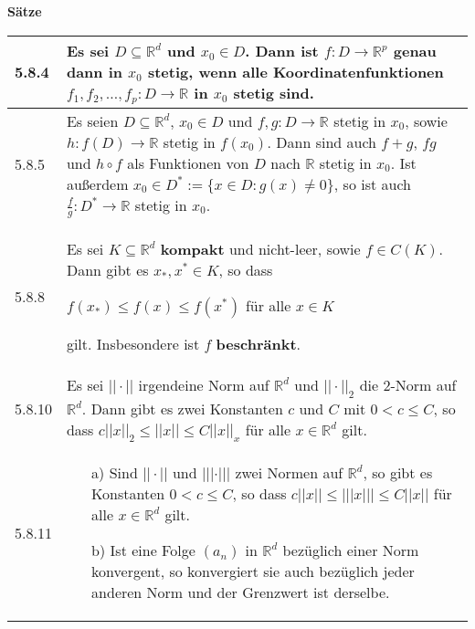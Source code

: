     \noindent 
    \textbf{Sätze}
    \begin{table}[H]
    \begin{tabularx}{\textwidth}{X m{16cm}}
        \toprule

        5.8.4 & Es sei $D \subseteq \mathbb{R}^d$ und $x_0 \in D$. Dann ist $f: D \rightarrow \mathbb{R}^p$ genau dann in $x_0$
                \textbf{stetig}, wenn alle Koordinatenfunktionen $f_1, f_2, \dots, f_p : D \rightarrow \mathbb{R}$ in $x_0$ stetig sind. \\
        \midrule
        5.8.5 &  Es seien $D \subseteq \mathbb{R}^d$, $x_0 \in D$ und $f,g : D \rightarrow \mathbb{R}$ stetig in $x_0$, sowie
                $h : f(D) \rightarrow \mathbb{R}$ stetig in $f(x_0)$. Dann sind auch $f+g$, $fg$ und $h \circ f$ als Funktionen
                von $D$ nach $\mathbb{R}$ stetig in $x_0$. \hfill \break
                Ist au\ss erdem $x_0 \in D^* := \{x \in D: g(x) \neq 0\}$, so ist auch $\frac{f}{g}:D^* \rightarrow \mathbb{R}$ stetig in $x_0$. \\
        \midrule
        5.8.8 & Es sei $K \subseteq \mathbb{R}^d$ \textbf{kompakt} und nicht-leer, sowie $f \in C(K)$. Dann gibt es $x_*, x^* \in K$, so dass \hfill \break
                \centerline{$f(x_*) \leq f(x) \leq f(x^*)$ für alle $x \in K$}
                gilt. Insbesondere ist $f$ \textbf{beschränkt}. \\
        \midrule
        5.8.10& Es sei $||\cdot||$ irgendeine Norm auf $\mathbb{R}^d$ und $||\cdot||_2$ die 2-Norm auf $\mathbb{R}^d$. Dann gibt es zwei Konstanten
                $c$ und $C$ mit $0 < c \leq C$, so dass $c||x||_2  \leq ||x|| \leq C ||x||_x$ für alle $x \in \mathbb{R}^d$ gilt. \\
        \midrule
        5.8.11& \begin{itemize}[topsep=-0.5cm]
                    \item[a)] Sind $||\cdot||$ und $|||\cdot|||$ zwei Normen auf $\mathbb{R}^d$, so gibt es Konstanten $0 < c \leq C$, so dass
                                $c||x|| \leq |||x||| \leq C||x||$ für alle $x \in \mathbb{R}^d$ gilt.
                    \item[b)] Ist eine Folge $(a_n)$ in $\mathbb{R}^d$ bezüglich einer Norm konvergent, so konvergiert sie auch bezüglich  
                                jeder anderen Norm und der Grenzwert ist derselbe. 
                \end{itemize} \vspace{-0cm} \\
        \bottomrule
    \end{tabularx}
    \end{table}

